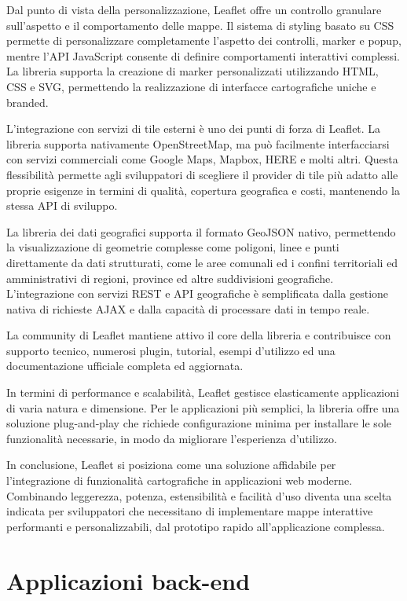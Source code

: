 Dal punto di vista della personalizzazione, Leaflet offre un controllo granulare sull'aspetto e il comportamento delle mappe. Il sistema di styling basato su CSS permette di personalizzare completamente l'aspetto dei controlli, marker e popup, mentre l'API JavaScript consente di definire comportamenti interattivi complessi. La libreria supporta la creazione di marker personalizzati utilizzando HTML, CSS e SVG, permettendo la realizzazione di interfacce cartografiche uniche e branded.

L'integrazione con servizi di tile esterni è uno dei punti di forza di Leaflet. La libreria supporta nativamente OpenStreetMap, ma può facilmente interfacciarsi con servizi commerciali come Google Maps, Mapbox, HERE e molti altri. Questa flessibilità permette agli sviluppatori di scegliere il provider di tile più adatto alle proprie esigenze in termini di qualità, copertura geografica e costi, mantenendo la stessa API di sviluppo.

La libreria dei dati geografici supporta il formato GeoJSON nativo, permettendo la visualizzazione di geometrie complesse come poligoni, linee e punti direttamente da dati strutturati, come le aree comunali ed i confini territoriali ed amministrativi di regioni, province ed altre suddivisioni geografiche. L'integrazione con servizi REST e API geografiche è semplificata dalla gestione nativa di richieste AJAX e dalla capacità di processare dati in tempo reale.

La community di Leaflet mantiene attivo il core della libreria e contribuisce con supporto tecnico, numerosi plugin, tutorial, esempi d'utilizzo ed una documentazione ufficiale completa ed aggiornata.

In termini di performance e scalabilità, Leaflet gestisce elasticamente applicazioni di varia natura e dimensione. Per le applicazioni più semplici, la libreria offre una soluzione plug-and-play che richiede configurazione minima per installare le sole funzionalità necessarie, in modo da migliorare l'esperienza d'utilizzo.

In conclusione, Leaflet si posiziona come una soluzione affidabile per l'integrazione di funzionalità cartografiche in applicazioni web moderne. Combinando leggerezza, potenza, estensibilità e facilità d'uso diventa una scelta indicata per sviluppatori che necessitano di implementare mappe interattive performanti e personalizzabili, dal prototipo rapido all'applicazione complessa.

\section{Applicazioni back-end}

